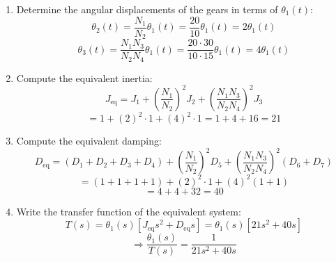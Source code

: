 \documentclass[11pt]{article}
\begin{document}
\begin{enumerate}[label=(\alph*), itemindent=*, leftmargin=*, nolistsep]
    \item Determine the angular displacements of the gears in terms of \( \theta_1(t) \):
    \[
    \theta_2(t) = \frac{N_1}{N_2} \theta_1(t) = \frac{20}{10} \theta_1(t) = 2 \theta_1(t)
    \]
    \[
    \theta_3(t) = \frac{N_1 N_3}{N_2 N_4} \theta_1(t) = \frac{20 \cdot 30}{10 \cdot 15} \theta_1(t) = 4 \theta_1(t)
    \]

    \item Compute the equivalent inertia:
    \[
    J_{\text{eq}} = J_1 + \left(\frac{N_1}{N_2}\right)^2 J_2 + \left(\frac{N_1 N_3}{N_2 N_4}\right)^2 J_3
    \]
    \[
    = 1 + (2)^2 \cdot 1 + (4)^2 \cdot 1 = 1 + 4 + 16 = \boxed{21}
    \]

    \item Compute the equivalent damping:
    \[
    D_{\text{eq}} = (D_1 + D_2 + D_3 + D_4) + \left(\frac{N_1}{N_2}\right)^2 D_5 + \left(\frac{N_1 N_3}{N_2 N_4}\right)^2 (D_6 + D_7)
    \]
    \[
    = (1+1+1+1) + (2)^2 \cdot 1 + (4)^2 (1+1)
    \]
    \[
    = 4 + 4 + 32 = \boxed{40}
    \]

    \item Write the transfer function of the equivalent system:
    \[
    T(s) = \theta_1(s) \left[ J_{\text{eq}} s^2 + D_{\text{eq}} s \right]
    = \theta_1(s) \left[ 21 s^2 + 40 s \right]
    \]
    \[
    \Rightarrow \boxed{ \frac{\theta_1(s)}{T(s)} = \frac{1}{21 s^2 + 40 s} }
    \]
\end{enumerate}

\end{document}
